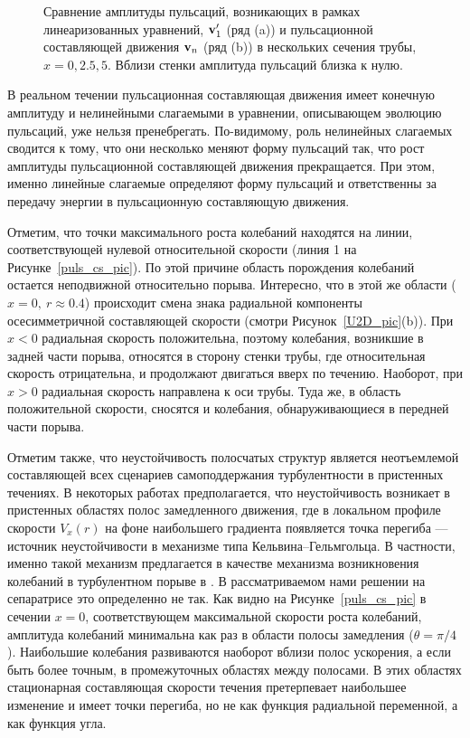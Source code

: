 \begin{figure}
\caption{Сравнение амплитуды пульсаций, возникающих в рамках линеаризованных уравнений, $\mathbf{v}'_1$ (ряд (a)) и пульсационной составляющей движения $\mathbf{v}_n$ (ряд (b)) в нескольких сечения трубы, $x = 0, 2.5, 5$. Вблизи стенки амплитуда пульсаций близка к нулю.}
\label{lin_amp_cmp_pic}
\end{figure}

В реальном течении пульсационная составляющая движения имеет конечную амплитуду и нелинейными слагаемыми в уравнении, описывающем эволюцию пульсаций, уже нельзя пренебрегать. По-видимому, роль нелинейных слагаемых сводится к тому, что они несколько меняют форму пульсаций так, что рост амплитуды пульсационной составляющей движения прекращается. При этом, именно линейные слагаемые определяют форму пульсаций и ответственны за передачу энергии в пульсационную составляющую движения. 

Отметим, что точки максимального роста колебаний находятся на линии, соответствующей нулевой относительной скорости (линия 1 на Рисунке~\ref{puls_cs_pic}). По этой причине область порождения колебаний остается неподвижной относительно порыва. Интересно, что в этой же области ($x = 0,\ r \approx 0.4$) происходит смена знака радиальной компоненты осесимметричной составляющей скорости (смотри Рисунок~\ref{U2D_pic}(b)). При $x<0$ радиальная скорость положительна, поэтому колебания, возникшие в задней части порыва, относятся в сторону стенки трубы, где относительная скорость отрицательна, и продолжают двигаться вверх по течению. Наоборот, при $x>0$ радиальная скорость направлена к оси трубы. Туда же, в область положительной скорости, сносятся и колебания, обнаруживающиеся в передней части порыва.

Отметим также, что неустойчивость полосчатых структур является неотъемлемой составляющей всех сценариев самоподдержания турбулентности в пристенных течениях. В некоторых работах предполагается, что неустойчивость возникает в пристенных областях полос замедленного движения, где в локальном профиле скорости $V_x(r)$ на фоне наибольшего градиента появляется точка перегиба --- источник неустойчивости в механизме типа Кельвина--Гельмгольца. В частности, именно такой механизм предлагается в качестве механизма возникновения колебаний в турбулентном порыве в \cite{Shimizu2009}. В рассматриваемом нами решении на сепаратрисе это определенно не так. Как видно на Рисунке~\ref{puls_cs_pic} в сечении $x=0$, соответствующем максимальной скорости роста колебаний, амплитуда колебаний минимальна как раз в области полосы замедления ($\theta=\pi/4$). Наибольшие колебания развиваются наоборот вблизи полос ускорения, а если быть более точным, в промежуточных областях между полосами. В этих областях стационарная составляющая скорости течения претерпевает наибольшее изменение и имеет точки перегиба, но не как функция радиальной переменной, а как функция угла.



